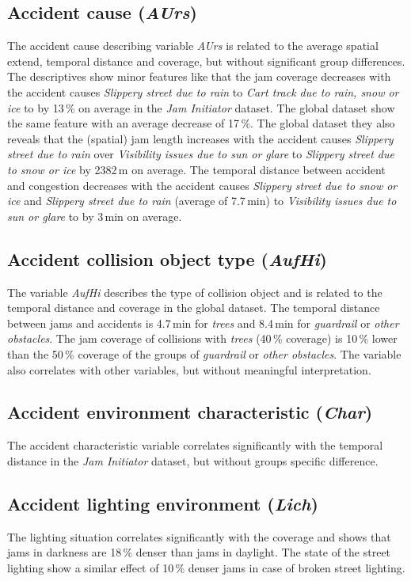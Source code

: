 \subsection{Accident cause (\textit{AUrs})}
\label{analysis_sum_AUrs}
The accident cause describing variable \textit{AUrs} is related to the average spatial extend, temporal distance and coverage, but without significant group differences. The descriptives show minor features like that the jam coverage decreases with the accident causes \textit{Slippery street due to rain} to \textit{Cart track due to rain, snow or ice} to by 13\,\% on average in the \textit{Jam Initiator} dataset. The global dataset show the same feature with an average decrease of 17\,\%. The global dataset they also reveals that the (spatial) jam length increases with the accident causes \textit{Slippery street due to rain} over \textit{Visibility issues due to sun or glare} to \textit{Slippery street due to snow or ice} by 2382\,m on average. The temporal distance between accident and congestion decreases with the accident causes \textit{Slippery street due to snow or ice} and \textit{Slippery street due to rain} (average of 7.7\,min) to \textit{Visibility issues due to sun or glare} to by 3\,min on average.

\subsection{Accident collision object type (\textit{AufHi})}
\label{analysis_sum_AufHi}
The variable \textit{AufHi} describes the type of collision object and is related to the temporal distance and coverage in the global dataset. The temporal distance between jams and accidents is 4.7\,min for \textit{trees} and 8.4\,min for \textit{guardrail} or \textit{other obstacles}. The jam coverage of collisions with \textit{trees} (40\,\% coverage) is 10\,\% lower than the 50\,\% coverage of the groups of \textit{guardrail} or \textit{other obstacles}. The variable also correlates with other variables, but without meaningful interpretation.

\subsection{Accident environment characteristic (\textit{Char})}
\label{analysis_sum_Char}
The accident characteristic variable correlates significantly with the temporal distance in the \textit{Jam Initiator} dataset, but without groups specific difference.

\subsection{Accident lighting environment (\textit{Lich})}
\label{analysis_sum_Lich}
The lighting situation correlates significantly with the coverage and shows that jams in darkness are 18\,\% denser than jams in daylight. The state of the street lighting show a similar effect of 10\,\% denser jams in case of broken street lighting.

